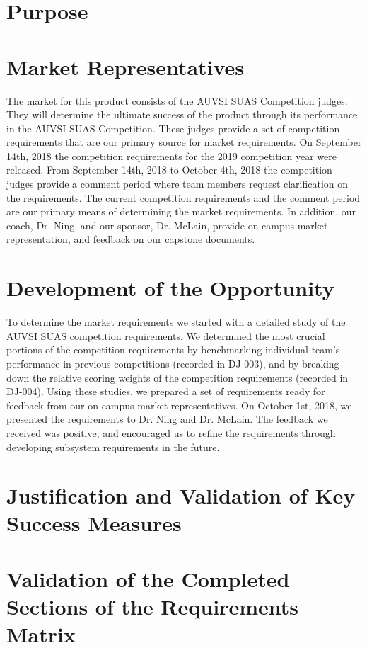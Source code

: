 \documentclass[]{auvsi_doc}
\begin{document}
\CapstoneTitlePage

\section{Purpose}
\section{Market Representatives}
The market for this product consists of the AUVSI SUAS Competition judges.
They will determine the ultimate success of the product through its performance in the AUVSI SUAS Competition.
These judges provide a set of competition requirements that are our primary source for market requirements.
On September 14th, 2018 the competition requirements for the 2019 competition year were released.
From September 14th, 2018 to October 4th, 2018 the competition judges provide a comment period where team members request clarification on the requirements.
The current competition requirements and the comment period are our primary means of determining the market requirements.
In addition, our coach, Dr. Ning, and our sponsor, Dr. McLain, provide on-campus market representation, and feedback on our capstone documents. 

\section{Development of the Opportunity}

To determine the market requirements we started with a detailed study of the AUVSI SUAS competition requirements.
We determined the most crucial portions of the competition requirements by benchmarking individual team's performance in previous competitions (recorded in DJ-003), and by breaking down the relative scoring weights of the competition requirements (recorded in DJ-004). 
Using these studies, we prepared a set of requirements ready for feedback from our on campus market representatives.
On October 1st, 2018, we presented the requirements to Dr. Ning and Dr. McLain.
The feedback we received was positive, and encouraged us to refine the requirements through developing subsystem requirements in the future.

\section{Justification and Validation of Key Success Measures}
\section{Validation of the Completed Sections of the Requirements Matrix}
\end{document}
